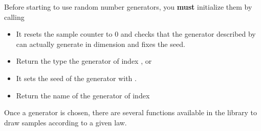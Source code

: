 Before starting to use random number generators, you {\bf must} initialize them by
calling
\begin{itemize}
\item {}
  \sshortdescribe It resets the sample counter to $0$ and checks that the
  generator described by  can actually generate
   in dimension  and fixes the seed.
\end{itemize}

\begin{itemize}

\item {}
  \sshortdescribe Return the type the generator of index ,
   or 
\item {}
  \sshortdescribe It sets the seed of the generator  with
  .
\item {}
  \sshortdescribe Return the name of the generator of index 
\end{itemize}

Once a generator is chosen, there are several functions available in the
library to draw samples according to a given law.

